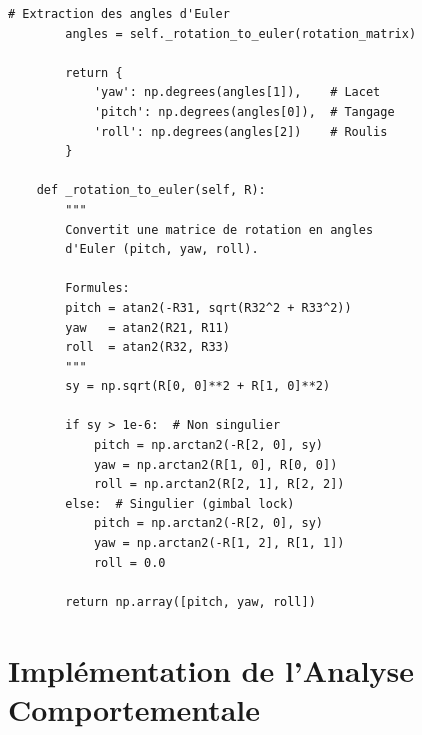 \begin{lstlisting}[style=pythonstyle, caption={Module d'estimation de la pose de la tête.}, label={lst:head_pose}]
        # Extraction des angles d'Euler
        angles = self._rotation_to_euler(rotation_matrix)
        
        return {
            'yaw': np.degrees(angles[1]),    # Lacet
            'pitch': np.degrees(angles[0]),  # Tangage
            'roll': np.degrees(angles[2])    # Roulis
        }
    
    def _rotation_to_euler(self, R):
        """
        Convertit une matrice de rotation en angles 
        d'Euler (pitch, yaw, roll).
        
        Formules:
        pitch = atan2(-R31, sqrt(R32^2 + R33^2))
        yaw   = atan2(R21, R11)
        roll  = atan2(R32, R33)
        """
        sy = np.sqrt(R[0, 0]**2 + R[1, 0]**2)
        
        if sy > 1e-6:  # Non singulier
            pitch = np.arctan2(-R[2, 0], sy)
            yaw = np.arctan2(R[1, 0], R[0, 0])
            roll = np.arctan2(R[2, 1], R[2, 2])
        else:  # Singulier (gimbal lock)
            pitch = np.arctan2(-R[2, 0], sy)
            yaw = np.arctan2(-R[1, 2], R[1, 1])
            roll = 0.0
        
        return np.array([pitch, yaw, roll])
\end{lstlisting}

\section{Implémentation de l'Analyse Comportementale}

